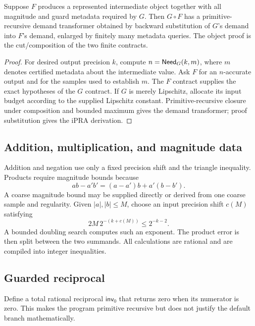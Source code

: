 \begin{theorem}
Suppose \(F\) produces a represented intermediate object together with all magnitude and guard metadata required by \(G\).  Then \(G\circ F\) has a primitive-recursive demand transformer obtained by backward substitution of \(G\)'s demand into \(F\)'s demand, enlarged by finitely many metadata queries.  The object proof is the cut/composition of the two finite contracts.
\end{theorem}

\begin{proof}
For desired output precision \(k\), compute \(n=\mathsf{Need}_G(k,m)\), where \(m\) denotes certified metadata about the intermediate value.  Ask \(F\) for an \(n\)-accurate output and for the samples used to establish \(m\).  The \(F\) contract supplies the exact hypotheses of the \(G\) contract.  If \(G\) is merely Lipschitz, allocate its input budget according to the supplied Lipschitz constant.  Primitive-recursive closure under composition and bounded maximum gives the demand transformer; proof substitution gives the iPRA derivation.
\end{proof}

\subsection{Addition, multiplication, and magnitude data}

Addition and negation use only a fixed precision shift and the triangle inequality.  Products require magnitude bounds because
\[
  ab-a'b'=(a-a')b+a'(b-b').
\]
A coarse magnitude bound may be supplied directly or derived from one coarse sample and regularity.  Given \(|a|,|b|\leq M\), choose an input precision shift \(c(M)\) satisfying
\[
  2M\,2^{-(k+c(M))}\leq 2^{-k-2}.
\]
A bounded doubling search computes such an exponent.  The product error is then split between the two summands.  All calculations are rational and are compiled into integer inequalities.

\subsection{Guarded reciprocal}

Define a total rational reciprocal \(\mathsf{inv}_0\) that returns zero when its numerator is zero.  This makes the program primitive recursive but does not justify the default branch mathematically.

